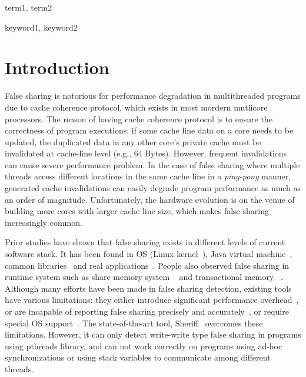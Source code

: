 \documentclass[10pt]{sigplanconf}
\begin{document}

\terms
term1, term2

\keywords
keyword1, keyword2

\section{Introduction}

False sharing is notorious for performance degradation in multithreaded
programs due to cache coherence protocol, which exists in most mordern 
 mutlicore processors.
The reason of having cache coherence protocol is to ensure the correctness of
program executions: 
if some cache line data on a core needs to be updated, the duplicated data in any other core's private 
cache must be invalidated at cache-line level (e.g., 64 Bytes). 
However, frequent invalidations can cause severe performance problem.
In the case of false sharing where multiple threads access different locations
in the same cache line in a \textit{ping-pong} manner, generated cache
invalidations can easily degrade program performance as much as an order of magnitude. 
Unfortunately, the hardware evolution is on the venue of building more cores
with larger cache line size, which makes false sharing increasingly common.

Prior studies have shown that false sharing exists in different levels of current software stack.
It has been found in OS (Linux kernel~\cite{OSfalsesharing}), Java virtual machine~\cite{JVMfalsesharing}, 
common libraries~\cite{libfalsesharing} and real applications~\cite{appfalsesharing}. 
People also observed false sharing in runtime system such as share memory system
~\cite{dsmfalsesharing} and transactional memory ~\cite{tmfalsesharing}.
Although many efforts have been made in false sharing detection, existing
tools have various limitations:
they either introduce significant performance overhead~\cite{falseshare:simulator, falseshare:binaryinstrumentation1,falseshare:binaryinstrumentation2}, or 
 are incapable of reporting false sharing 
precisely and accurately~\cite{qinzhaodetection, detect:ptu, detect:intel, falseshare:binaryinstrumentation1, DProf, falseshare:binaryinstrumentation2}, 
or require special OS support~\cite{OSdetection}.
The state-of-the-art tool, Sheriff~\cite{sheriff} overcomes these limitations. However, 
it can only detect write-write type false sharing in programs using pthreads library,
and can not work correctly on programs using ad-hoc synchronizations or using stack variables to communicate among different threads. 
\end{document}
